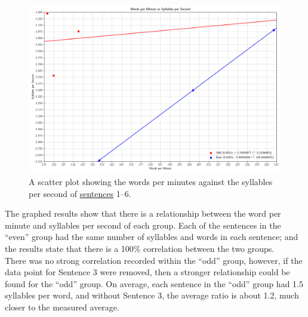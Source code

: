 \documentclass[lab=1,title={Speaking rate},turnin=false]{com310lab}
\begin{document}
\begin{results}%


	\begin{figure}[H]
		\centering
		\caption{A scatter plot showing the words per minutes against the syllables per second of \hyperref[tab:data]{sentences} 1--6.}
		\label{fig:results}
		\includegraphics[width=\textwidth]{washington_lab1_graph}
	\end{figure}
\end{results}

\begin{discussion}%
	The graphed results show that there is a relationship between the word per minute and syllables per second of each group.
	Each of the sentences in the ``even'' group had the same number of syllables and words in each sentence;
	and the results state that there is a 100\% correlation between the two groups.\\

	There was no strong correlation recorded within the ``odd'' group, however, if the data point for Sentence 3 were removed, then a stronger relationship could be found for the ``odd'' group.
	On average, each sentence in the ``odd'' group had 1.5 syllables per word, and without Sentence 3, the average ratio is about 1.2, much closer to the measured average.
\end{discussion}
\end{document}
